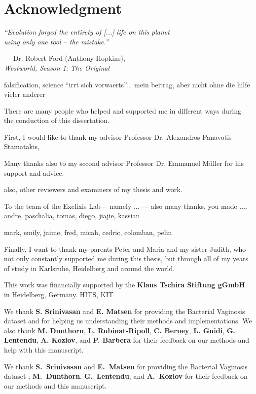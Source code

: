 \section*{Acknowledgment}
\vspace*{1em}

\epigraph
{\textit{``Evolution forged the entirety of [...] life on this planet \\ using only one tool -- the mistake.''}}
{--- Dr. Robert Ford (Anthony Hopkins),\\ \textit{Westworld, Season 1: The Original}}


falsification, science ``irrt sich vorwaerts''... mein beitrag, aber nicht ohne die hilfe vieler anderer


There are many people who helped and supported me in different ways during the conduction of this dissertation.

First, I would like to thank my advisor Professor Dr. Alexandros Panavotis Stamatakis,

Many thanks also to my second advisor Professor Dr. Emmanuel Müller for his support and advice.

also, other reviewers and examiners of my thesis and work.

To the team of the Exelixis Lab--- namely ... --- also many thanks, you made ....
andre, paschalia, tomas, diego, jiajie, kassian

mark, emily, jaime, fred, micah, cedric, colomban, pelin

Finally, I want to thank my parents Peter and Maria and my sister Judith,
who not only constantly supported me during this thesis,
but through all of my years of study in Karlsruhe, Heidelberg and around the world.


This work was financially supported by the \textbf{Klaus Tschira Stiftung gGmbH} in Heidelberg, Germany.
HITS, KIT

We thank \textbf{S. Srinivasan} and \textbf{E. Matsen}
for providing the Bacterial Vaginosis dataset \cite{Srinivasan2012}
and for helping us understanding their methods and implementations.
We also thank \textbf{M. Dunthorn}, \textbf{L. Rubinat-Ripoll}, \textbf{C. Berney}, \textbf{L. Guidi},
\textbf{G. Lentendu}, %
\textbf{A. Kozlov}, and \textbf{P. Barbera}
for their feedback on our methods and help with this manuscript.

We thank \textbf{S.~Srinivasan} and \textbf{E.~Matsen}
for providing the Bacterial Vaginosis dataset \citep{Srinivasan2012};
\textbf{M.~Dunthorn}, \textbf{G.~Lentendu}, %
and \textbf{A.~Kozlov}
for their feedback on our methods and this manuscript.

